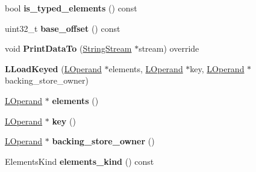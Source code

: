 \begin{DoxyCompactItemize}
\item 
bool {\bfseries is\+\_\+typed\+\_\+elements} () const \hypertarget{classv8_1_1internal_1_1_l_load_keyed_a1f6509c51d2c9c3a8e87dad8131ba8b2}{}\label{classv8_1_1internal_1_1_l_load_keyed_a1f6509c51d2c9c3a8e87dad8131ba8b2}

\item 
uint32\+\_\+t {\bfseries base\+\_\+offset} () const \hypertarget{classv8_1_1internal_1_1_l_load_keyed_a944c93975338d43236e1a696b686f4a4}{}\label{classv8_1_1internal_1_1_l_load_keyed_a944c93975338d43236e1a696b686f4a4}

\item 
void {\bfseries Print\+Data\+To} (\hyperlink{classv8_1_1internal_1_1_string_stream}{String\+Stream} $\ast$stream) override\hypertarget{classv8_1_1internal_1_1_l_load_keyed_ab79d974cf88e1e1dbd886b24f0ff1984}{}\label{classv8_1_1internal_1_1_l_load_keyed_ab79d974cf88e1e1dbd886b24f0ff1984}

\item 
{\bfseries L\+Load\+Keyed} (\hyperlink{classv8_1_1internal_1_1_l_operand}{L\+Operand} $\ast$elements, \hyperlink{classv8_1_1internal_1_1_l_operand}{L\+Operand} $\ast$key, \hyperlink{classv8_1_1internal_1_1_l_operand}{L\+Operand} $\ast$backing\+\_\+store\+\_\+owner)\hypertarget{classv8_1_1internal_1_1_l_load_keyed_ad304d9ea6496224e4a11a6cae2ee335b}{}\label{classv8_1_1internal_1_1_l_load_keyed_ad304d9ea6496224e4a11a6cae2ee335b}

\item 
\hyperlink{classv8_1_1internal_1_1_l_operand}{L\+Operand} $\ast$ {\bfseries elements} ()\hypertarget{classv8_1_1internal_1_1_l_load_keyed_a2fdaa6ebcc228ac46d2a03cffd1468ea}{}\label{classv8_1_1internal_1_1_l_load_keyed_a2fdaa6ebcc228ac46d2a03cffd1468ea}

\item 
\hyperlink{classv8_1_1internal_1_1_l_operand}{L\+Operand} $\ast$ {\bfseries key} ()\hypertarget{classv8_1_1internal_1_1_l_load_keyed_aea9caf0333cbad4a04007bd93e0fb176}{}\label{classv8_1_1internal_1_1_l_load_keyed_aea9caf0333cbad4a04007bd93e0fb176}

\item 
\hyperlink{classv8_1_1internal_1_1_l_operand}{L\+Operand} $\ast$ {\bfseries backing\+\_\+store\+\_\+owner} ()\hypertarget{classv8_1_1internal_1_1_l_load_keyed_abaa0161e1ba4f83060c3bdd5bcf52c44}{}\label{classv8_1_1internal_1_1_l_load_keyed_abaa0161e1ba4f83060c3bdd5bcf52c44}

\item 
Elements\+Kind {\bfseries elements\+\_\+kind} () const \hypertarget{classv8_1_1internal_1_1_l_load_keyed_a59cb1eff8d46bdb1d5d5c59aec4e9f47}{}\label{classv8_1_1internal_1_1_l_load_keyed_a59cb1eff8d46bdb1d5d5c59aec4e9f47}


\end{DoxyCompactItemize}
